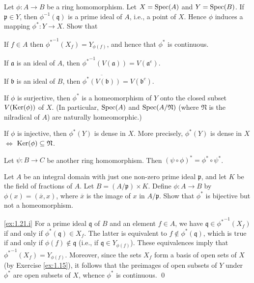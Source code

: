 \begin{exercise}
\label{ex:1.21}
Let $\phi : A \to B$ be a ring homomorphism.
Let $X = \operatorname{Spec}(A)$ and $Y = \operatorname{Spec}(B)$.
If $\mathfrak p \in Y$, then $\phi^{-1}(\mathfrak q)$ is a prime ideal of $A$, i.e., a point of $X$.
Hence $\phi$ induces a mapping $\phi^* : Y \to X$.
Show that
\begin{rlist}
\item
\label{ex:1.21.i}
If $f \in A$ then ${\phi^*}^{-1}(X_f) = Y_{\phi(f)}$, and hence that $\phi^*$ is continuous.
\item
\label{ex:1.21.ii}
If $\mathfrak a$ is an ideal of $A$, then ${\phi^*}^{-1}(V(\mathfrak a)) = V(\mathfrak a^e)$.
\item
\label{ex:1.21.iii}
If $\mathfrak b$ is an ideal of $B$, then $\overline{\phi^*(V(\mathfrak b))} = V(\mathfrak b^c)$.
\item
\label{ex:1.21.iv}
If $\phi$ is surjective, then $\phi^*$ is a homeomorphism of $Y$ onto the closed subset $V(\operatorname{Ker}(\phi))$ of $X$.
(In particular, $\operatorname{Spec}(A)$ and $\operatorname{Spec}(A/\mathfrak N)$ (where $\mathfrak N$ is the nilradical of $A$) are naturally homeomorphic.)
\item
\label{ex:1.21.v}
If $\phi$ is injective, then $\phi^*(Y)$ is dense in $X$.
More precisely, $\phi^*(Y)$ is dense in $X$ $\iff$ $\operatorname{Ker}(\phi) \subseteq \mathfrak N$.
\item
\label{ex:1.21.vi}
Let $\psi : B \to C$ be another ring homomorphism.
Then $(\psi \circ \phi)^* = \phi^* \circ \psi^*$.
\item
\label{ex:1.21.vii}
Let $A$ be an integral domain with just one non-zero prime ideal $\mathfrak p$, and let $K$ be the field of fractions of $A$.
Let $B = (A/\mathfrak p)\times K$.
Define $\phi : A \to B$ by $\phi(x) = (\overline x,x)$, where $\overline x$ is the image of $x$ in $A/\mathfrak p$.
Show that $\phi^*$ is bijective but not a homeomorphism.
\end{rlist}
\end{exercise}

\noindent
\ref{ex:1.21.i}
For a prime ideal $\mathfrak q$ of $B$ and an element $f \in A$, we have $\mathfrak q \in {\phi^*}^{-1}(X_f)$ if and only if $\phi^*(\mathfrak q) \in X_f$.
The latter is equivalent to $f \notin \phi^*(\mathfrak q)$, which is true if and only if $\phi(f) \notin \mathfrak q$ (i.e., if $\mathfrak q \in Y_{\phi(f)}$).
These equivalences imply that ${\phi^*}^{-1}(X_f) = Y_{\phi(f)}$.
Moreover, since the sets $X_f$ form a basis of open sets of $X$ (by Exercise \ref{ex:1.15}), it follows that the preimages of open subsets of $Y$ under $\phi^*$ are open subsets of $X$, whence $\phi^*$ is continuous.
\qed

